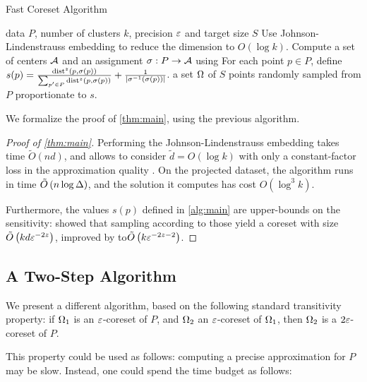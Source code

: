 \begin{algorithm}[tb]
   \caption{Fast Coreset Algorithm}
   \label{alg:main}
\begin{algorithmic}
    data $P$, number of clusters $k$, precision $\varepsilon$ and target size $S$
   \STATE Use Johnson-Lindenstrauss embedding to reduce the dimension to $O(\log k)$.
   \STATE Compute a set of centers $\mathcal A$ and an assignment $\sigma : P \rightarrow \mathcal A$ using \fkmeans
   \STATE For each point $p \in P$, define $s(p) = \frac{\operatorname{dist}^z(p, \sigma(p))}{\sum_{p' \in P} \operatorname{dist}^z(p, \sigma(p))} + \frac{1}{|\sigma^{-1}(\sigma(p))|}$.
    a set $\Omega$ of $S$ points randomly sampled from $P$ proportionate to $s$.
\end{algorithmic}
\end{algorithm}


We formalize the proof of \cref{thm:main}, using the previous algorithm.

\begin{proof}[Proof of \cref{thm:main}]
Performing the Johnson-Lindenstrauss embedding takes time $\tilde O(nd)$, and allows to consider $\tilde d=O(\log k)$ with only a constant-factor loss in the approximation quality  \cite{makarychev2019performance}. 
On the projected dataset, the algorithm \fkmeans runs in time $\tilde O\left( n \log \Delta\right)$, and the solution it computes has cost $O(\log^3 k)$. 

Furthermore, the values $s(p)$ defined in \cref{alg:main} are upper-bounds on the sensitivity: \cite{FeldmanL11} showed that sampling according to those yield a coreset with size $\tilde O \left( k d \varepsilon^{-2z}\right)$, improved by \cite{HuangV20} to$\tilde O \left( k \varepsilon^{-2z -2} \right)$.
\end{proof}



\subsection{A Two-Step Algorithm}
We present a different algorithm, based on the following standard transitivity property: if $\Omega_1$ is an $\varepsilon$-coreset of $P$, and $\Omega_2$ an $\varepsilon$-coreset of $\Omega_1$, then $\Omega_2$ is a $2\varepsilon$-coreset of $P$.

This property could be used as follows: computing a precise approximation for $P$ may be slow. Instead, one could spend the time budget as follows:

